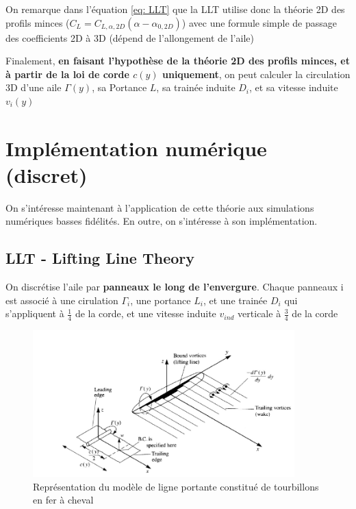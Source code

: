 On remarque dans l'équation \ref{eq: LLT} que la LLT utilise donc la théorie 2D des profils minces ($C_L = C_{L, \alpha, 2D}(\alpha - \alpha_{0,2D})$) avec une formule simple de passage des coefficients 2D à 3D (dépend de l'allongement de l'aile)

Finalement, \textbf{en faisant l'hypothèse de la théorie 2D des profils minces, et à partir de la loi de corde $c(y)$ uniquement}, on peut calculer la circulation 3D d'une aile $\Gamma(y)$, sa Portance $L$, sa trainée induite $D_i$, et sa vitesse induite $v_i(y)$

\section{Implémentation numérique (discret)} 
\label{sec:Ch1.2}

On s'intéresse maintenant à l'application de cette théorie aux simulations numériques basses fidélités. En outre, on s'intéresse à son implémentation. 

\subsection{LLT - Lifting Line Theory} 
\label{subsec:Ch1.2.1}

On discrétise l'aile par \textbf{panneaux le long de l'envergure}. Chaque panneaux i est associé à une cirulation $\Gamma_i$, une portance $L_i$, et une trainée $D_i$ qui s'appliquent à $\frac{1}{4}$ de la corde, et une vitesse induite $v_{ind}$ verticale à $\frac{3}{4}$ de la corde

\begin{figure}[H]
    \centering
    \includegraphics[width=0.9\textwidth]{Pics/01 - Basses Fidélités/vortex VSM.png}
    \caption{Représentation du modèle de ligne portante constitué de tourbillons en fer à cheval}
    \label{fig: vortex vsm}
\end{figure}

